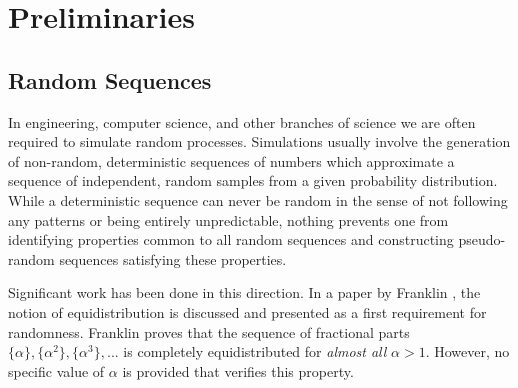 \documentclass[11pt,a4paper]{tesis}
\theoremstyle{plain}
\theoremstyle{definition}
\begin{document}

\def\autor{Emilio Guido Almansi}
\def\tituloTesis{Secuencias completamente equidistribuidas basadas en secuencias de De Bruijn}
\def\runtitulo{Secuencias completamente equidistribuidas basadas en secuencias de De Bruijn}
\def\runtitle{Completely Equidistributed Sequences \\ Based on De Bruijn Sequences}
\def\director{Verónica Becher}
\def\lugar{Buenos Aires, 2019}




\frontmatter
\pagestyle{empty}


\cleardoublepage




\cleardoublepage
\tableofcontents

\mainmatter
\pagestyle{headings}

\chapter{Preliminaries}\label{chapter:preliminaries}

\section{Random Sequences}

In engineering, computer science, and other branches of science we are often required to simulate random processes. Simulations usually involve the generation of non-random, deterministic sequences of numbers which approximate a sequence of independent, random samples from a given probability distribution. While a deterministic sequence can never be random in the sense of not following any patterns or being entirely unpredictable, nothing prevents one from identifying properties common to all random sequences and constructing pseudo-random sequences satisfying these properties.

Significant work has been done in this direction. In a paper by Franklin \cite{franklin-1963}, the notion of equidistribution is discussed and presented as a first requirement for randomness. Franklin proves that the sequence of fractional parts $\{ \alpha \}, \{ \alpha^2 \}, \{ \alpha^3 \}, ...$ is completely equidistributed for \textit{almost all} $\alpha > 1$. However, no specific value of $\alpha$ is provided that verifies this property.
\end{document}

